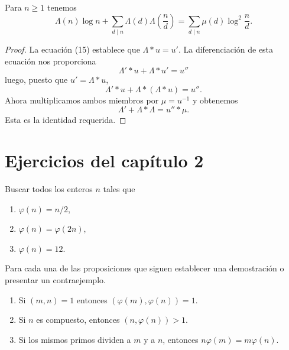 \documentclass[12pt,a4paper]{book}
\begin{document}
    \begin{teorema}
        Para $n\geq1$ tenemos
        \begin{equation*}
            \Lambda(n)\log n+\sum_{d\mid n}\Lambda(d)\Lambda\left(\frac{n}{d}\right)
            =\sum_{d\mid n}\mu(d)\log^2\frac{n}{d}.
        \end{equation*}
    \end{teorema}

    \begin{proof}
        La ecuación (15) establece que $\Lambda*u=u'$. La diferenciación de esta ecuación
        nos proporciona
        \begin{equation*}
            \Lambda'*u+\Lambda*u'=u''
        \end{equation*}
        luego, puesto que $u'=\Lambda*u$,
        \begin{equation*}
            \Lambda'*u+\Lambda*(\Lambda*u)=u''.
        \end{equation*}
        Ahora multiplicamos ambos miembros por $\mu=u^{-1}$ y obtenemos
        \begin{equation*}
            \Lambda'+\Lambda*\Lambda=u''*\mu.
        \end{equation*}
        Esta es la identidad requerida.
    \end{proof}

    \section*{Ejercicios del capítulo 2}

    \begin{ejercicio}
        Buscar todos los enteros $n$ tales que
        \begin{enumerate}
            \item[(a)] $\varphi(n)=n/2$,
            \item[(b)] $\varphi(n)=\varphi(2n)$,
            \item[(c)] $\varphi(n)=12$.
        \end{enumerate}
    \end{ejercicio}

    \begin{ejercicio}
        Para cada una de las proposiciones que siguen establecer una demostración o
        presentar un contraejemplo.
        \begin{enumerate}
            \item[(a)] Si $(m,n)=1$ entonces $(\varphi(m),\varphi(n))=1$.
            \item[(b)] Si $n$ es compuesto, entonces $(n,\varphi(n))>1$.
            \item[(c)] Si los mismos primos dividen a $m$ y a $n$, entonces
            $n\varphi(m)=m\varphi(n)$.
        \end{enumerate}
    \end{ejercicio}
\end{document}
